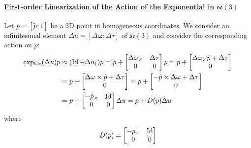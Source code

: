 \paragraph{First-order Linearization of the Action of the Exponential in $\mathfrak{se}(3)$}
Let $p=[\tilde{p};1]$ be a 3D point in homogeneous coordinates. We consider an infinitesimal element $\Delta u=[\Delta \mathbf{\omega};\Delta \tau]$ of $\mathfrak{se}(3)$ and consider the corresponding action on $p$:
\begin{equation}
\begin{split}
\operatorname{exp_{Lie}}(\Delta u)p &\approx (\operatorname{Id}+\Delta u_\dagger)p = p +
\begin{bmatrix}
\Delta \mathbf{\omega}_\times & \Delta \tau \\
0  & 0
\end{bmatrix} p
= p +
\begin{bmatrix}
\Delta \mathbf{\omega}_\times \tilde{p}+\Delta \tau \\
0
\end{bmatrix} \\
&= p +
\begin{bmatrix}
\Delta \mathbf{\omega} \times \tilde{p}+\Delta \tau \\
0
\end{bmatrix}
= p +
\begin{bmatrix}
-\tilde{p} \times \Delta \mathbf{\omega} + \Delta \tau \\
0
\end{bmatrix} \\
&= p +
\begin{bmatrix}
-\tilde{p}_\times & \operatorname{Id} \\
0 & 0
\end{bmatrix} \Delta u
= p + D(p)\Delta u
\end{split}
\end{equation}
where
\begin{equation}
D(p) = 
\begin{bmatrix}
-\tilde{p}_\times & \operatorname{Id} \\
0 & 0
\end{bmatrix}
\end{equation}

